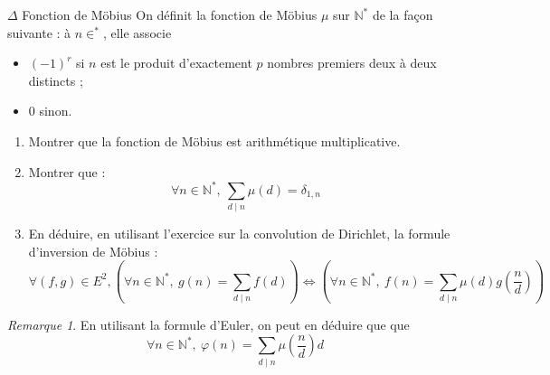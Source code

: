 \documentclass[french,a4paper]{article}
\newcommand{\N}{\mathbb{N}}
\newcommand{\st}{^*}
\theoremstyle{plain}
\theoremstyle{definition}
\theoremstyle{remark}
\newtheorem*{rmq}{Remarque}
\begin{document}
\begin{ex}[Moulin.57]{$\Delta$ Fonction de Möbius}
	On définit la fonction de Möbius $\mu$ sur $\N\st$ de la façon suivante : à $n\in\st$, elle associe
	\begin{itemize} 
		\item $(-1)^r$ si $n$ est le produit d'exactement $p$ nombres premiers deux à deux distincts ;
		\item $0$ sinon. 
	\end{itemize}
	\begin{enumerate}
		\item Montrer que la fonction de Möbius est arithmétique multiplicative.
		\item Montrer que : $$\forall n\in\N\st,\ \sum_{d\mid n}\mu(d)=\delta_{1,n}$$
		\item En déduire, en utilisant l'exercice sur la convolution de Dirichlet, la formule d'inversion de Möbius : $$\forall(f,g)\in E^2, \left(\forall n\in\N\st,\ g(n)=\sum_{d\mid n}f(d)\right)\iff\left(\forall n\in\N\st,\ f(n)=\sum_{d\mid n}\mu(d)g\left(\frac{n}{d}\right)\right)$$
	\end{enumerate}
\end{ex}
\begin{rmq}
	En utilisant la formule d'Euler, on peut en déduire que que $$\forall n\in\N\st,\ \varphi(n)=\sum_{d\mid n}\mu\left(\frac{n}{d}\right)d$$
\end{rmq}
\end{document}
